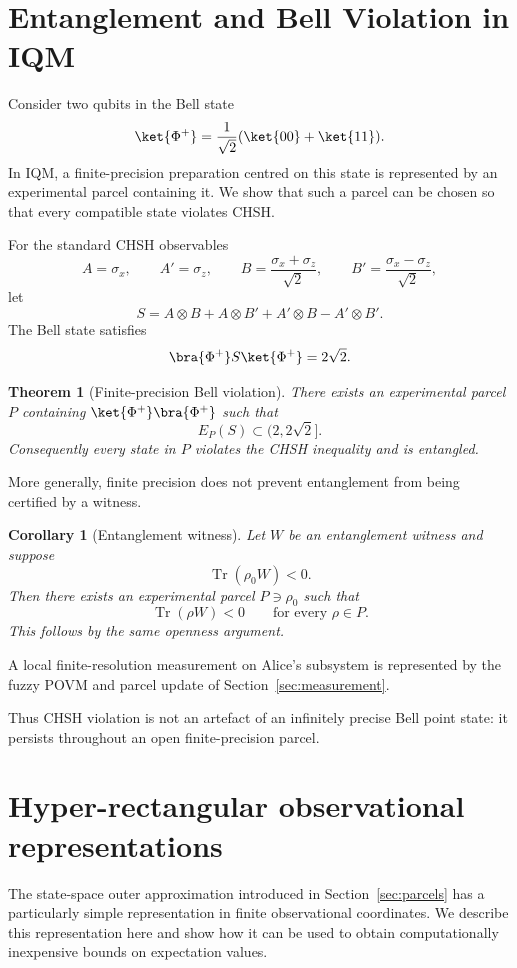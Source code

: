 \documentclass[11pt, onecolumn]{article}
\newtheorem{theorem}{Theorem}
\newtheorem{corollary}{Corollary}
\begin{document}
\section{Entanglement and Bell Violation in IQM}
\label{sec:entanglement}

Consider two qubits in the Bell state
\[
\ket{\Phi^+}
=
\frac{1}{\sqrt2}(\ket{00}+\ket{11}).
\]
In IQM, a finite-precision preparation centred on this state is
represented by an experimental parcel containing it. We show that such a
parcel can be chosen so that every compatible state violates CHSH.

For the standard CHSH observables
\[
A=\sigma_x,\qquad
A'=\sigma_z,\qquad
B=\frac{\sigma_x+\sigma_z}{\sqrt2},
\qquad
B'=\frac{\sigma_x-\sigma_z}{\sqrt2},
\]
let
\[
S
=
A\otimes B+A\otimes B'
+A'\otimes B-A'\otimes B'.
\]
The Bell state satisfies
\[
\bra{\Phi^+}S\ket{\Phi^+}=2\sqrt2.
\]

\begin{theorem}[Finite-precision Bell violation]
\label{bell-violation}
There exists an experimental parcel $P$ containing
$\ket{\Phi^+}\bra{\Phi^+}$ such that
\[
E_P(S)\subset(2,2\sqrt2].
\]
Consequently every state in $P$ violates the CHSH inequality and is
entangled.
\end{theorem}



More generally, finite precision does not prevent entanglement from being
certified by a witness.

\begin{corollary}[Entanglement witness]
Let $W$ be an entanglement witness and suppose
\[
\operatorname{Tr}(\rho_0W)<0.
\]
Then there exists an experimental parcel $P\ni\rho_0$ such that
\[
\operatorname{Tr}(\rho W)<0
\qquad\text{for every }\rho\in P.
\]
This follows by the same openness argument.
\end{corollary}

A local finite-resolution measurement on Alice's subsystem is represented
by the fuzzy POVM and parcel update of Section~\ref{sec:measurement}.

Thus CHSH violation is not an artefact of an infinitely precise Bell
point state: it persists throughout an open finite-precision parcel.
\section{Hyper-rectangular observational representations}
\label{sec:computational}

The state-space outer approximation introduced in
Section~\ref{sec:parcels} has a particularly simple representation in
finite observational coordinates. We describe this representation here
and show how it can be used to obtain computationally inexpensive bounds
on expectation values.
\end{document}
